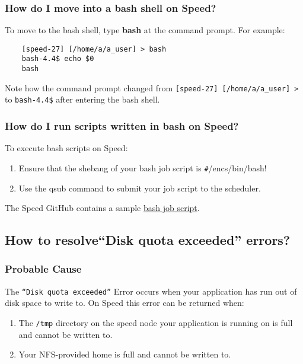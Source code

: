 \documentclass{easychair}
\begin{document}
\subsubsection{How do I move into a bash shell on Speed?}

To move to the bash shell, type \textbf{bash} at the command prompt.
For example:
\begin{verbatim}
	[speed-27] [/home/a/a_user] > bash
	bash-4.4$ echo $0
	bash
\end{verbatim}	

Note how the command prompt changed from \verb![speed-27] [/home/a/a_user] >! to \verb!bash-4.4$! after entering the bash shell.

\subsubsection{How do I run scripts written in bash on Speed?}

To execute bash scripts on Speed:
\begin{enumerate}
	\item 
Ensure that the shebang of your bash job script is \verb!#!/encs/bin/bash!
	\item 
Use the qsub command to submit your job script to the scheduler.
\end{enumerate}

The Speed GitHub contains a sample \href{https://github.com/NAG-DevOps/speed-hpc/blob/master/src/bash.sh}{bash job script}.  

\subsection{How to resolve``Disk quota exceeded'' errors?}

\subsubsection{Probable Cause}

The \texttt{``Disk quota exceeded''} Error occurs when your application has run out of disk space to write to. On Speed this error can be returned when:
\begin{enumerate}
	\item
The \texttt{/tmp} directory on the speed node your application is running on is full and cannot be written to.
	\item
Your NFS-provided home is full and cannot be written to.
\end{enumerate}
\end{document}
